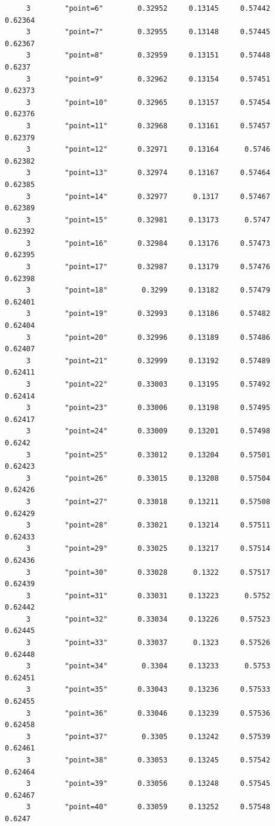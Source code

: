 \documentclass[
]{book}
\begin{document}
\begin{verbatim}
     3        "point=6"        0.32952     0.13145     0.57442     0.62364
     3        "point=7"        0.32955     0.13148     0.57445     0.62367
     3        "point=8"        0.32959     0.13151     0.57448      0.6237
     3        "point=9"        0.32962     0.13154     0.57451     0.62373
     3        "point=10"       0.32965     0.13157     0.57454     0.62376
     3        "point=11"       0.32968     0.13161     0.57457     0.62379
     3        "point=12"       0.32971     0.13164      0.5746     0.62382
     3        "point=13"       0.32974     0.13167     0.57464     0.62385
     3        "point=14"       0.32977      0.1317     0.57467     0.62389
     3        "point=15"       0.32981     0.13173      0.5747     0.62392
     3        "point=16"       0.32984     0.13176     0.57473     0.62395
     3        "point=17"       0.32987     0.13179     0.57476     0.62398
     3        "point=18"        0.3299     0.13182     0.57479     0.62401
     3        "point=19"       0.32993     0.13186     0.57482     0.62404
     3        "point=20"       0.32996     0.13189     0.57486     0.62407
     3        "point=21"       0.32999     0.13192     0.57489     0.62411
     3        "point=22"       0.33003     0.13195     0.57492     0.62414
     3        "point=23"       0.33006     0.13198     0.57495     0.62417
     3        "point=24"       0.33009     0.13201     0.57498      0.6242
     3        "point=25"       0.33012     0.13204     0.57501     0.62423
     3        "point=26"       0.33015     0.13208     0.57504     0.62426
     3        "point=27"       0.33018     0.13211     0.57508     0.62429
     3        "point=28"       0.33021     0.13214     0.57511     0.62433
     3        "point=29"       0.33025     0.13217     0.57514     0.62436
     3        "point=30"       0.33028      0.1322     0.57517     0.62439
     3        "point=31"       0.33031     0.13223      0.5752     0.62442
     3        "point=32"       0.33034     0.13226     0.57523     0.62445
     3        "point=33"       0.33037      0.1323     0.57526     0.62448
     3        "point=34"        0.3304     0.13233      0.5753     0.62451
     3        "point=35"       0.33043     0.13236     0.57533     0.62455
     3        "point=36"       0.33046     0.13239     0.57536     0.62458
     3        "point=37"        0.3305     0.13242     0.57539     0.62461
     3        "point=38"       0.33053     0.13245     0.57542     0.62464
     3        "point=39"       0.33056     0.13248     0.57545     0.62467
     3        "point=40"       0.33059     0.13252     0.57548      0.6247

\end{verbatim}
\end{document}
